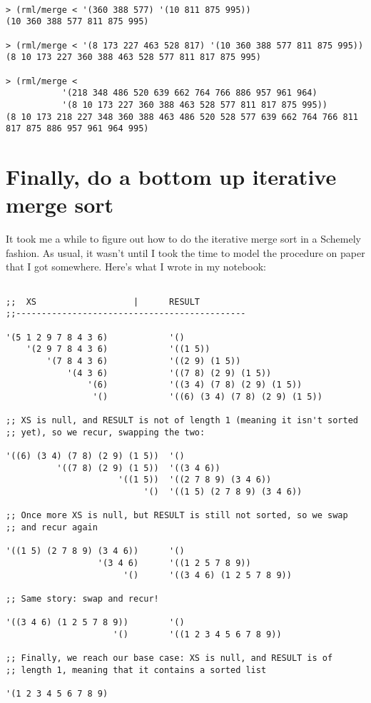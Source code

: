 \documentclass[12pt,openright,draft]{book}
\begin{document}
\begin{verbatim}

> (rml/merge < '(360 388 577) '(10 811 875 995))
(10 360 388 577 811 875 995)

> (rml/merge < '(8 173 227 463 528 817) '(10 360 388 577 811 875 995))
(8 10 173 227 360 388 463 528 577 811 817 875 995)

> (rml/merge <
           '(218 348 486 520 639 662 764 766 886 957 961 964)
           '(8 10 173 227 360 388 463 528 577 811 817 875 995))
(8 10 173 218 227 348 360 388 463 486 520 528 577 639 662 764 766 811 817 875 886 957 961 964 995)

\end{verbatim}

\section{Finally, do a bottom up iterative merge sort}

It took me a while to figure out how to do the iterative merge sort in a Schemely fashion. As usual, it wasn't until I took the time to model the procedure on paper that I got somewhere. Here's what I wrote in my notebook:

\begin{verbatim}

;;  XS                   |      RESULT
;;---------------------------------------------

'(5 1 2 9 7 8 4 3 6)            '()
    '(2 9 7 8 4 3 6)            '((1 5))
        '(7 8 4 3 6)            '((2 9) (1 5))
            '(4 3 6)            '((7 8) (2 9) (1 5))
                '(6)            '((3 4) (7 8) (2 9) (1 5))
                 '()            '((6) (3 4) (7 8) (2 9) (1 5))

;; XS is null, and RESULT is not of length 1 (meaning it isn't sorted
;; yet), so we recur, swapping the two:

'((6) (3 4) (7 8) (2 9) (1 5))  '()
          '((7 8) (2 9) (1 5))  '((3 4 6))
                      '((1 5))  '((2 7 8 9) (3 4 6))
                           '()  '((1 5) (2 7 8 9) (3 4 6))

;; Once more XS is null, but RESULT is still not sorted, so we swap
;; and recur again

'((1 5) (2 7 8 9) (3 4 6))      '()
                  '(3 4 6)      '((1 2 5 7 8 9))
                       '()      '((3 4 6) (1 2 5 7 8 9))

;; Same story: swap and recur!

'((3 4 6) (1 2 5 7 8 9))        '()
                     '()        '((1 2 3 4 5 6 7 8 9))

;; Finally, we reach our base case: XS is null, and RESULT is of
;; length 1, meaning that it contains a sorted list

'(1 2 3 4 5 6 7 8 9)

\end{verbatim}
\end{document}
